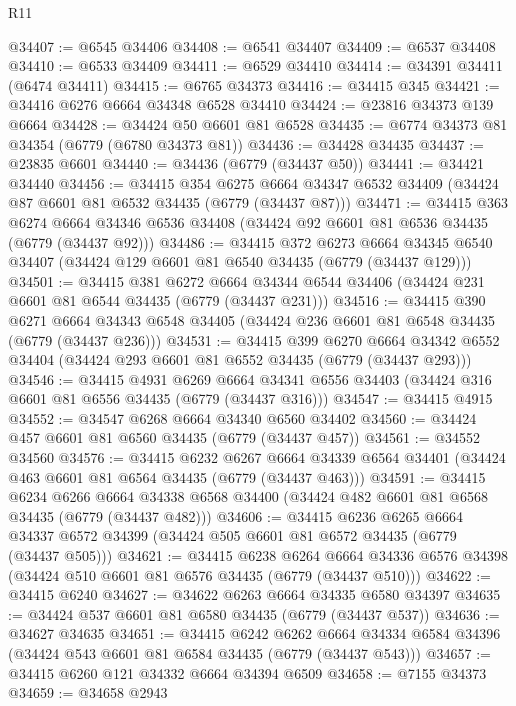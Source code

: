 \begin{lexlean}{R11}
\begin{coremodule}
@34407 := @6545 @34406
@34408 := @6541 @34407
@34409 := @6537 @34408
@34410 := @6533 @34409
@34411 := @6529 @34410
@34414 := @34391 @34411 (@6474 @34411)
@34415 := @6765 @34373
@34416 := @34415 @345
@34421 := @34416 @6276 @6664 @34348 @6528 @34410
@34424 := @23816 @34373 @139 @6664
@34428 := @34424 @50 @6601 @81 @6528
@34435 := @6774 @34373 @81 @34354 (@6779 (@6780 @34373 @81))
@34436 := @34428 @34435
@34437 := @23835 @6601
@34440 := @34436 (@6779 (@34437 @50))
@34441 := @34421 @34440
@34456 := @34415
    @354
    @6275
    @6664
    @34347
    @6532
    @34409
    (@34424 @87 @6601 @81 @6532 @34435 (@6779 (@34437 @87)))
@34471 := @34415
    @363
    @6274
    @6664
    @34346
    @6536
    @34408
    (@34424 @92 @6601 @81 @6536 @34435 (@6779 (@34437 @92)))
@34486 := @34415
    @372
    @6273
    @6664
    @34345
    @6540
    @34407
    (@34424 @129 @6601 @81 @6540 @34435 (@6779 (@34437 @129)))
@34501 := @34415
    @381
    @6272
    @6664
    @34344
    @6544
    @34406
    (@34424 @231 @6601 @81 @6544 @34435 (@6779 (@34437 @231)))
@34516 := @34415
    @390
    @6271
    @6664
    @34343
    @6548
    @34405
    (@34424 @236 @6601 @81 @6548 @34435 (@6779 (@34437 @236)))
@34531 := @34415
    @399
    @6270
    @6664
    @34342
    @6552
    @34404
    (@34424 @293 @6601 @81 @6552 @34435 (@6779 (@34437 @293)))
@34546 := @34415
    @4931
    @6269
    @6664
    @34341
    @6556
    @34403
    (@34424 @316 @6601 @81 @6556 @34435 (@6779 (@34437 @316)))
@34547 := @34415 @4915
@34552 := @34547 @6268 @6664 @34340 @6560 @34402
@34560 := @34424 @457 @6601 @81 @6560 @34435 (@6779 (@34437 @457))
@34561 := @34552 @34560
@34576 := @34415
    @6232
    @6267
    @6664
    @34339
    @6564
    @34401
    (@34424 @463 @6601 @81 @6564 @34435 (@6779 (@34437 @463)))
@34591 := @34415
    @6234
    @6266
    @6664
    @34338
    @6568
    @34400
    (@34424 @482 @6601 @81 @6568 @34435 (@6779 (@34437 @482)))
@34606 := @34415
    @6236
    @6265
    @6664
    @34337
    @6572
    @34399
    (@34424 @505 @6601 @81 @6572 @34435 (@6779 (@34437 @505)))
@34621 := @34415
    @6238
    @6264
    @6664
    @34336
    @6576
    @34398
    (@34424 @510 @6601 @81 @6576 @34435 (@6779 (@34437 @510)))
@34622 := @34415 @6240
@34627 := @34622 @6263 @6664 @34335 @6580 @34397
@34635 := @34424 @537 @6601 @81 @6580 @34435 (@6779 (@34437 @537))
@34636 := @34627 @34635
@34651 := @34415
    @6242
    @6262
    @6664
    @34334
    @6584
    @34396
    (@34424 @543 @6601 @81 @6584 @34435 (@6779 (@34437 @543)))
@34657 := @34415 @6260 @121 @34332 @6664 @34394 @6509
@34658 := @7155 @34373
@34659 := @34658 @2943

\end{coremodule}
\end{lexlean}
